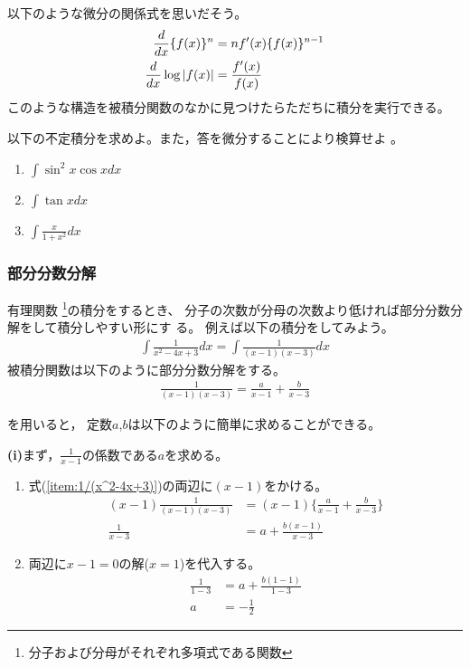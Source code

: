 \documentclass[twocolumn,11pt]{jarticle}
\begin{document}
以下のような微分の関係式を思いだそう。
\begin{align}
  \frac{d}{dx}\{f(x)\}^n&=nf'(x)\{f(x)\}^{n-1}\notag\\
  \frac{d}{dx}\log |f(x)|&=\frac{f'(x)}{f(x)}\notag
\end{align}
このような構造を被積分関数のなかに見つけたらただちに積分を実行できる。

\exercise
以下の不定積分を求めよ。また，答を微分することにより検算せよ
。
\begin{enumerate}
\item \label{item:sin2xcosx}$\displaystyle\int\sin^2x\cos xdx$
\item \label{item:tanx}$\displaystyle\int \tan x dx$
\item \label{item:x/(1+x2)}$\displaystyle\int \frac{x}{1+x^2}dx$
\end{enumerate}

\subsubsection{部分分数分解}

有理関数
\footnote{分子および分母がそれぞれ多項式である関数}の積分をするとき、
分子の次数が分母の次数より低ければ部分分数分解をして積分しやすい形にす
る。
例えば以下の積分をしてみよう。
\begin{align*}
  \int \frac{1}{x^2-4x+3}dx=\int \frac{1}{(x-1)(x-3)}dx
\end{align*}
被積分関数は以下のように部分分数分解をする。
\begin{align}
  \label{item:1/(x^2-4x+3)}
  \frac{1}{(x-1)(x-3)}=\frac{a}{x-1}+\frac{b}{x-3}
\end{align}

を用いると，
定数$a$,$b$は以下のように簡単に求めることができる。

\noindent
\textbf{(i)}まず，$\frac{1}{x-1}$の係数である$a$を求める。
\begin{enumerate}
\item 式(\ref{item:1/(x^2-4x+3)})の両辺に$(x-1)$をかける。
\begin{align*}
  (x-1)\frac{1}{(x-1)(x-3)}&=(x-1)\{\frac{a}{x-1}+\frac{b}{x-3}\}\\
  \frac{1}{x-3}&=a+\frac{b(x-1)}{x-3}
\end{align*}
\item 両辺に$x-1=0$の解($x=1$)を代入する。
\begin{align*}
  \frac{1}{1-3}&=a+\frac{b(1-1)}{1-3}\\
  a&=-\frac{1}{2}
\end{align*}
\end{enumerate}
\end{document}
